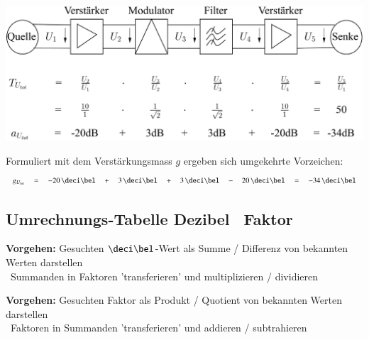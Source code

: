 
\includegraphics[width=0.9\columnwidth]{images/kaskadierung_verstaerkung_daempfung.png}

Formuliert mit dem Verstärkungsmass $g$ ergeben sich umgekehrte Vorzeichen:
$$ g_{U_{\rm tot}} \quad = \quad - 20 \, \deci\bel \quad  + \quad 3 \, \deci\bel \quad + 
    \quad 3 \, \deci\bel \quad - \quad 20 \, \deci\bel \quad = \quad -34 \, \deci\bel $$


\subsection{Umrechnungs-Tabelle Dezibel \textlrarrow\ Faktor}

\textbf{Vorgehen:} Gesuchten $\deci\bel$-Wert als Summe / Differenz von bekannten Werten darstellen\\
\textrightarrow\ Summanden in Faktoren 'transferieren' und multiplizieren / dividieren \medskip

\textbf{Vorgehen:} Gesuchten Faktor als Produkt / Quotient von bekannten Werten darstellen\\
\textrightarrow\ Faktoren in Summanden 'transferieren' und addieren / subtrahieren \medskip


